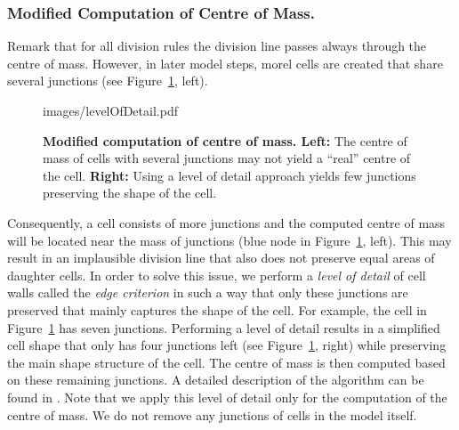 \documentclass[11pt,a4paper, final]{article}
\begin{document}
\subsubsection{Modified Computation of Centre of Mass.}
\noindent
Remark that for all division rules the division line passes always through the centre of mass. However, in later model steps, morel cells are created that share several junctions (see Figure~\ref{fig:levelOfDetail}, left).
%
\begin{figure}[htbp]
	\begin{center}
		\begin{overpic}[width=1.\linewidth]{images/levelOfDetail.pdf}
		\end{overpic}
\caption[Modified computation of centre of mass.]
{
{\bf Modified computation of centre of mass. Left:} The centre of mass of cells with several junctions may not yield a ``real'' centre of the cell. \textbf{Right:} Using a level of detail approach yields few junctions preserving the shape of the cell.
}
	\label{fig:levelOfDetail}
	\end{center}
\end{figure}
%
Consequently, a cell consists of more junctions and the computed centre of mass will be located near the mass of junctions (blue node in Figure~\ref{fig:levelOfDetail}, left). This may result in an implausible division line that also does not preserve equal areas of daughter cells. In order to solve this issue, we perform a \textit{level of detail} of cell walls called the \textit{edge criterion} in such a way that only these junctions are preserved that mainly captures the shape of the cell. For example, the cell in Figure~\ref{fig:levelOfDetail} has seven junctions. Performing a level of detail results in a simplified cell shape that only has four junctions left (see Figure~\ref{fig:levelOfDetail}, right) while preserving the main shape structure of the cell. The centre of mass is then computed based on these remaining junctions. A detailed description of the algorithm can be found in \cite[p.\ 59--60]{FangerauDiss_2015}. Note that we apply this level of detail only for the computation of the centre of mass. We do not remove any junctions of cells in the model itself.
\end{document}
